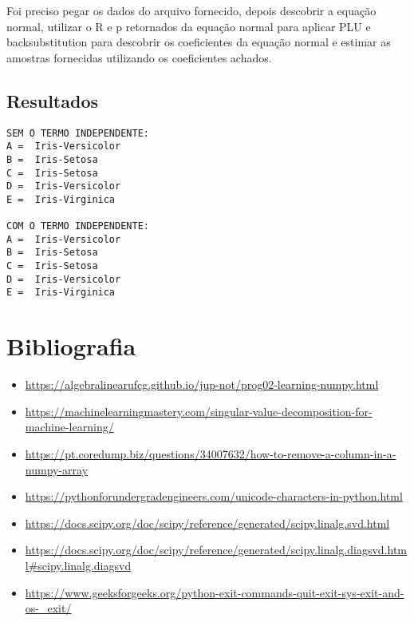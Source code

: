 \documentclass[a4paper,12pt,twoside]{article}
\begin{document}
Foi preciso pegar os dados do arquivo fornecido, depois descobrir a equação normal, utilizar o R e p retornados da equação normal para aplicar PLU e backsubstitution para descobrir os coeficientes da equação normal e estimar as amostras fornecidas utilizando os coeficientes achados.

\subsection{Resultados}
\begin{lstlisting}
SEM O TERMO INDEPENDENTE: 
A =  Iris-Versicolor
B =  Iris-Setosa
C =  Iris-Setosa
D =  Iris-Versicolor
E =  Iris-Virginica

COM O TERMO INDEPENDENTE: 
A =  Iris-Versicolor
B =  Iris-Setosa
C =  Iris-Setosa
D =  Iris-Versicolor
E =  Iris-Virginica
\end{lstlisting}




\section{Bibliografia}
\begin{itemize}
   \item \url{https://algebralinearufcg.github.io/jup-not/prog02-learning-numpy.html}
   \item \url{https://machinelearningmastery.com/singular-value-decomposition-for-machine-learning/}
   \item \url{https://pt.coredump.biz/questions/34007632/how-to-remove-a-column-in-a-numpy-array}
   \item \url{https://pythonforundergradengineers.com/unicode-characters-in-python.html}
   \item \url{https://docs.scipy.org/doc/scipy/reference/generated/scipy.linalg.svd.html}
   \item \url{https://docs.scipy.org/doc/scipy/reference/generated/scipy.linalg.diagsvd.html#scipy.linalg.diagsvd}
   \item \url{https://www.geeksforgeeks.org/python-exit-commands-quit-exit-sys-exit-and-os-_exit/}
 \end{itemize}
\end{document}
